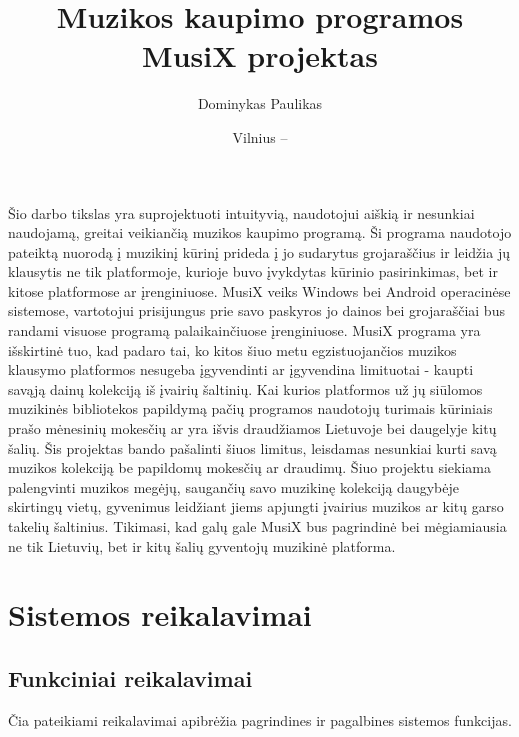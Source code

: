 \documentclass{VUMIFPSkursinis}
\title{Muzikos kaupimo programos MusiX projektas}
\author{Dominykas Paulikas}
\date{Vilnius – \the\year}
\begin{document}
	
\maketitle
\cleardoublepage{}
\setcounter{page}{2}

\tableofcontents

Šio darbo tikslas yra suprojektuoti intuityvią, naudotojui aiškią ir nesunkiai naudojamą, greitai veikiančią muzikos kaupimo programą. Ši programa naudotojo pateiktą nuorodą į muzikinį kūrinį prideda į jo sudarytus grojaraščius ir leidžia jų klausytis ne tik platformoje, kurioje buvo įvykdytas kūrinio pasirinkimas, bet ir kitose platformose ar įrenginiuose. MusiX veiks Windows bei Android operacinėse sistemose, vartotojui prisijungus prie savo paskyros jo dainos bei grojaraščiai bus randami visuose programą palaikainčiuose įrenginiuose. MusiX programa yra išskirtinė tuo, kad padaro tai, ko kitos šiuo metu egzistuojančios muzikos klausymo platformos nesugeba įgyvendinti ar įgyvendina limituotai - kaupti savąją dainų kolekciją iš įvairių šaltinių. Kai kurios platformos už jų siūlomos muzikinės bibliotekos papildymą pačių programos naudotojų turimais kūriniais prašo mėnesinių mokesčių ar yra išvis draudžiamos Lietuvoje bei daugelyje kitų šalių. Šis projektas bando pašalinti šiuos limitus, leisdamas nesunkiai kurti savą muzikos kolekciją be papildomų mokesčių ar draudimų. Šiuo projektu siekiama palengvinti muzikos megėjų, saugančių savo muzikinę kolekciją daugybėje skirtingų vietų, gyvenimus leidžiant jiems apjungti įvairius muzikos ar kitų garso takelių šaltinius. Tikimasi, kad galų gale MusiX bus pagrindinė bei mėgiamiausia ne tik Lietuvių, bet ir kitų šalių gyventojų muzikinė platforma.

\section{Sistemos reikalavimai}

\subsection{Funkciniai reikalavimai}
Čia pateikiami reikalavimai apibrėžia pagrindines ir pagalbines sistemos funkcijas. 
\end{document}
